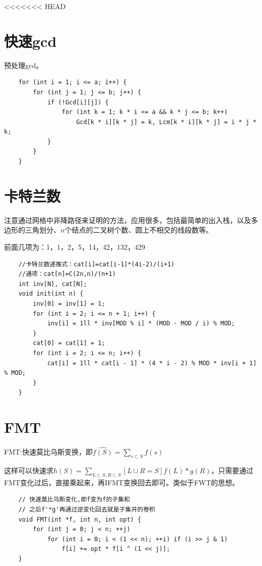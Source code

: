 \documentclass[a4paper,11pt,twoside,fontset = fandol,UTF8]{ctexbook} %
\begin{document}
<<<<<<< HEAD
	\section{快速gcd}
	预处理gcd。
	\begin{lstlisting}
	for (int i = 1; i <= a; i++) {
	    for (int j = 1; j <= b; j++) {
	        if (!Gcd[i][j]) {
	            for (int k = 1; k * i <= a && k * j <= b; k++)
	                Gcd[k * i][k * j] = k, Lcm[k * i][k * j] = i * j * k;
	        }
	    }
	}
	\end{lstlisting}
	
	\section{卡特兰数}
	
	注意通过网格中非降路径来证明的方法，应用很多，包括最简单的出入栈，以及多边形的三角划分、$n$个结点的二叉树个数、圆上不相交的线段数等。
	
	前面几项为：1，1，2，5，14，42，132，429
	
	\begin{lstlisting}
	//卡特兰数递推式：cat[i]=cat[i-1]*(4i-2)/(i+1)
	//通项：cat[n]=C(2n,n)/(n+1) 
	int inv[N], cat[N];
	void init(int n) {
	    inv[0] = inv[1] = 1;
	    for (int i = 2; i <= n + 1; i++) {
	        inv[i] = 1ll * inv[MOD % i] * (MOD - MOD / i) % MOD;
	    }
	    cat[0] = cat[1] = 1;
	    for (int i = 2; i <= n; i++) {
	        cat[i] = 1ll * cat[i - 1] * (4 * i - 2) % MOD * inv[i + 1] % MOD;
	    }
	} 
	\end{lstlisting}
	
	\section{FMT}
	
	FMT:快速莫比乌斯变换，即$\displaystyle \hat{f(S)}=\sum_{s\subset S}f(s)$
	
	这样可以快速求$\displaystyle h(S)=\sum_{L\subset S,R\subset S}[L\cup R=S]f(L)*g(R)$，只需要通过FMT变化过后，直接乘起来，再IFMT变换回去即可。类似于FWT的思想。
	
	\begin{lstlisting}
	// 快速莫比乌斯变化,即f变为f的子集和
	// 之后f'*g'再通过逆变化回去就是子集并的卷积
	void FMT(int *f, int n, int opt) {
	    for (int j = 0; j < n; ++j)
	        for (int i = 0; i < (1 << n); ++i) if (i >> j & 1)
	            f[i] += opt * f[i ^ (1 << j)];
	}
	\end{lstlisting}
	
\end{document}
